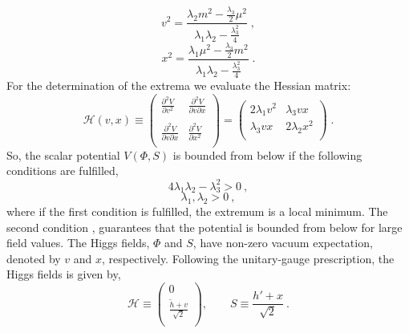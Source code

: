 \newline
\begin{equation}
v^2=\frac{\lambda_2 m^2-\frac{\lambda_3}{2} \mu^2}{\lambda_1 \lambda_2- \frac{\lambda_3^2}{4}} \; , \end{equation}
\begin{equation}
x^2=\frac{\lambda_1 \mu^2-\frac{\lambda_3}{2} m^2}{\lambda_1 \lambda_2- \frac{\lambda_3^2}{4}} \; . \end{equation}
\newline
For the determination of the extrema we evaluate the Hessian matrix:
\begin{equation}
\mathcal{H}(v,x) \equiv \left(
\begin{array}{cc}
\frac{ \partial ^2 V}{\partial v^2} &  \frac{\partial ^2 V}{\partial v \partial x}  \\
\\
\frac{\partial ^2 V}{\partial v \partial x}   & \frac{\partial ^2 V}{\partial x^2} \\
\end{array}
\right) =     \left(
\begin{array}{lr}
  2 \lambda_1 v^2 &  \lambda_3 vx \\
\lambda_3 vx & 2 \lambda_2 x^2 \\ 
\end{array} \right) \; .\end{equation}
\newline
So, the scalar potential $V(\Phi, S)$ is bounded from below if the following conditions are fulfilled,
\begin{equation}
 4 \lambda_1  \lambda_2 - \lambda_3^2 >0   \: , \end{equation}
\begin{equation}
 \lambda_1 , \lambda_2  >0    \: , \end{equation}
where if the first condition is fulfilled, the extremum is a local minimum. The
second condition , guarantees that the potential is bounded from below for large field values.
The Higgs fields, $\Phi$ and $S$, have non-zero vacuum expectation, denoted by $v$ and $x$, respectively.
Following the unitary-gauge prescription, the Higgs fields is given by,
\newline
\begin{equation}
{\mathcal H} \equiv \left(
\begin{array}{c}
0  \\
\frac{\tilde{h}+v }{\sqrt{2}}  \\
\end{array}
\right)
, \qquad 
S \equiv \frac{h'+x }{\sqrt{2}}  \: . \end{equation}
